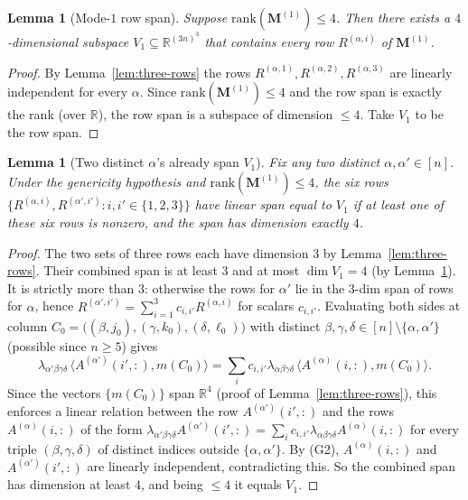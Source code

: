 \documentclass[12pt]{article}
\newtheorem{lemma}[theorem]{Lemma}
\theoremstyle{definition}
\begin{document}
\begin{lemma}[Mode-$1$ row span]\label{lem:row-span}
Suppose $\mathrm{rank}(\mathbf{M}^{(1)})\leq 4$. Then there exists a $4$-dimensional subspace
$V_1\subseteq\mathbb{R}^{(3n)^3}$ that contains every row $R^{(\alpha,i)}$ of $\mathbf{M}^{(1)}$.
\end{lemma}

\begin{proof}
By Lemma~\ref{lem:three-rows} the rows $R^{(\alpha,1)},R^{(\alpha,2)},R^{(\alpha,3)}$ are
linearly independent for every $\alpha$. Since $\mathrm{rank}(\mathbf{M}^{(1)})\leq 4$ and
the row span is exactly the rank (over $\mathbb{R}$), the row span is a subspace of dimension
$\leq 4$. Take $V_1$ to be the row span.
\end{proof}

\begin{lemma}[Two distinct $\alpha$'s already span $V_1$]\label{lem:two-alpha-span}
Fix any two distinct $\alpha,\alpha'\in[n]$. Under the genericity hypothesis and
$\mathrm{rank}(\mathbf{M}^{(1)})\leq 4$, the six rows
$\{R^{(\alpha,i)},R^{(\alpha',i')}:i,i'\in\{1,2,3\}\}$ have linear span equal to $V_1$ if at
least one of these six rows is nonzero, and the span has dimension exactly $4$.
\end{lemma}

\begin{proof}
The two sets of three rows each have dimension $3$ by Lemma~\ref{lem:three-rows}. Their
combined span is at least $3$ and at most $\dim V_1=4$ (by Lemma~\ref{lem:row-span}). It is
strictly more than $3$: otherwise the rows for $\alpha'$ lie in the $3$-dim span of rows for
$\alpha$, hence $R^{(\alpha',i')}=\sum_{i=1}^{3}c_{i,i'}R^{(\alpha,i)}$ for scalars $c_{i,i'}$.
Evaluating both sides at column $C_0=\bigl((\beta,j_0),(\gamma,k_0),(\delta,\ell_0)\bigr)$
with distinct $\beta,\gamma,\delta\in[n]\setminus\{\alpha,\alpha'\}$ (possible since
$n\geq 5$) gives
\[
\lambda_{\alpha'\beta\gamma\delta}\,\bigl\langle A^{(\alpha')}(i',:),m(C_0)\bigr\rangle
=\sum_{i}c_{i,i'}\lambda_{\alpha\beta\gamma\delta}\,\bigl\langle A^{(\alpha)}(i,:),m(C_0)\bigr\rangle.
\]
Since the vectors $\{m(C_0)\}$ span $\mathbb{R}^4$ (proof of Lemma~\ref{lem:three-rows}),
this enforces a linear relation between the row $A^{(\alpha')}(i',:)$ and the rows
$A^{(\alpha)}(i,:)$ of the form
$\lambda_{\alpha'\beta\gamma\delta} A^{(\alpha')}(i',:)
=\sum_{i}c_{i,i'}\lambda_{\alpha\beta\gamma\delta}A^{(\alpha)}(i,:)$
for every triple $(\beta,\gamma,\delta)$ of distinct indices outside $\{\alpha,\alpha'\}$. By
(G2), $A^{(\alpha)}(i,:)$ and $A^{(\alpha')}(i',:)$ are linearly independent, contradicting
this. So the combined span has dimension at least $4$, and being $\leq 4$ it equals $V_1$.
\end{proof}
\end{document}
